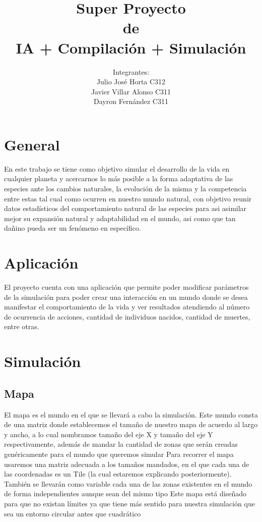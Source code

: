 \documentclass{llncs}
\title{\large\huge Super Proyecto\\de \\ IA + Compilación + Simulación}
\author{Integrantes: \\ Julio José Horta C312 \\Javier Villar Alonso C311 \\ Dayron Fernández C311}
\begin{document}
	
\maketitle

\newpage

\section{General}
En este trabajo se tiene como objetivo simular el desarrollo de la vida en cualquier planeta y acercarnos lo más posible a la forma adaptativa de las especies ante los cambios naturales, la evolución de la misma y la competencia entre estas tal cual como ocurren en nuestro mundo natural, con objetivo reunir datos estadísticos del comportamiento natural de las especies para asi asimilar mejor su expansión natural y adaptabilidad en el mundo, asi como que tan dañino pueda ser un fenómeno en específico. 

\section{Aplicación}
El proyecto cuenta con una aplicación que permite poder modificar parámetros de la simulación para poder crear una interacción en un mundo donde se desea manifestar el comportamiento de la vida y ver resultados atendiendo al número de ocurrencia de acciones, cantidad de individuos nacidos, cantidad de muertes, entre otras.

\section{Simulación}

\subsection{Mapa}
El mapa es el mundo en el que se llevará a cabo la simulación. Este mundo consta de una matriz donde establecemos el tamaño de nuestro mapa de acuerdo al largo y ancho, a lo cual nombramos tamaño del eje X y tamaño del eje Y respectivamente, además de mandar la cantidad de zonas que serán creadas genéricamente para el mundo que queremos simular
\newline
\newline
Para recorrer el mapa usaremos una matriz adecuada a los tamaños mandados, en el que cada una de las coordenadas es un Tile (la cual estaremos explicando posteriormente). También se llevarán como variable cada una de las zonas existentes en el mundo de forma independientes aunque sean del mismo tipo
\newline
\newline
Este mapa está diseñado para que no existan límites ya que tiene más sentido para nuestra simulación que sea un entorno circular antes que cuadrático
\end{document}
